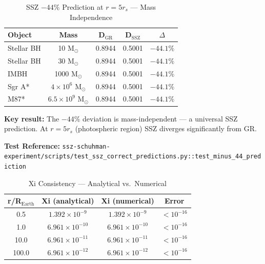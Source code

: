 \begin{table}[h]
\centering
\caption{SSZ $-44\%$ Prediction at $r = 5r_s$ — Mass Independence}
\label{tab:minus-44-percent}
\begin{tabular}{|l|c|c|c|c|}
\hline
\textbf{Object} & \textbf{Mass} & \textbf{D$_{\text{GR}}$} & \textbf{D$_{\text{SSZ}}$} & \textbf{$\Delta$} \\
\hline
Stellar BH & 10 M$_\odot$ & 0.8944 & 0.5001 & $-44.1\%$ \\
Stellar BH & 30 M$_\odot$ & 0.8944 & 0.5001 & $-44.1\%$ \\
IMBH & 1000 M$_\odot$ & 0.8944 & 0.5001 & $-44.1\%$ \\
Sgr A* & $4 \times 10^6$ M$_\odot$ & 0.8944 & 0.5001 & $-44.1\%$ \\
M87* & $6.5 \times 10^9$ M$_\odot$ & 0.8944 & 0.5001 & $-44.1\%$ \\
\hline
\end{tabular}
\end{table}

\textbf{Key result:} The $-44\%$ deviation is mass-independent — a universal SSZ prediction. At $r = 5r_s$ (photospheric region) SSZ diverges significantly from GR.

\textbf{Test Reference:} \texttt{ssz-schuhman-experiment/scripts/test\_ssz\_correct\_predictions.py::test\_minus\_44\_prediction}

\begin{table}[h]
\centering
\caption{Xi Consistency — Analytical vs.\ Numerical}
\label{tab:xi-consistency}
\begin{tabular}{|c|c|c|c|}
\hline
\textbf{r/R$_{\text{Earth}}$} & \textbf{Xi (analytical)} & \textbf{Xi (numerical)} & \textbf{Error} \\
\hline
0.5 & $1.392 \times 10^{-9}$ & $1.392 \times 10^{-9}$ & $< 10^{-16}$ \\
1.0 & $6.961 \times 10^{-10}$ & $6.961 \times 10^{-10}$ & $< 10^{-16}$ \\
10.0 & $6.961 \times 10^{-11}$ & $6.961 \times 10^{-11}$ & $< 10^{-16}$ \\
100.0 & $6.961 \times 10^{-12}$ & $6.961 \times 10^{-12}$ & $< 10^{-16}$ \\
\hline
\end{tabular}
\end{table}

